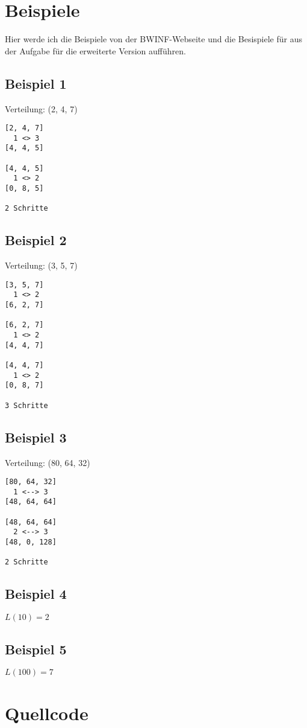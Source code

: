 \documentclass[a4paper,10pt]{scrartcl}
\begin{document}
\section{Beispiele}
Hier werde ich die Beispiele von der BWINF-Webseite und die Besispiele für aus der Aufgabe für die erweiterte Version aufführen.

\subsection{Beispiel 1}
Verteilung: (2, 4, 7)
\begin{lstlisting}
[2, 4, 7]
  1 <> 3
[4, 4, 5]

[4, 4, 5]
  1 <> 2
[0, 8, 5]

2 Schritte
\end{lstlisting}

\subsection{Beispiel 2}
Verteilung: (3, 5, 7)
\begin{lstlisting}
[3, 5, 7]
  1 <> 2
[6, 2, 7]

[6, 2, 7]
  1 <> 2
[4, 4, 7]

[4, 4, 7]
  1 <> 2
[0, 8, 7]

3 Schritte
\end{lstlisting}

\subsection{Beispiel 3}
Verteilung: (80, 64, 32)
\begin{lstlisting}
[80, 64, 32]
  1 <--> 3
[48, 64, 64]

[48, 64, 64]
  2 <--> 3
[48, 0, 128]

2 Schritte
\end{lstlisting}

\subsection{Beispiel 4}
\(L(10)=2\)

\subsection{Beispiel 5}
\(L(100)=7\)

\section{Quellcode}
\lstset{numbers=left}

\end{document}
